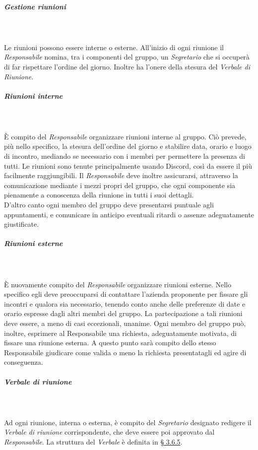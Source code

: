 \subparagraph{Gestione riunioni}\mbox{} \\ \mbox{} \\
Le riunioni possono essere interne o esterne. All'inizio di ogni riunione il \textit{Responsabile} nomina, tra i componenti del gruppo, un \textit{Segretario} che si occuperà di far rispettare l'ordine del giorno. Inoltre ha l'onere della stesura del \textit{Verbale di Riunione}\glo.

\subparagraph*{Riunioni interne} \mbox{} \\ \mbox{} \\
È compito del \textit{Responsabile} organizzare riunioni interne al gruppo. Ciò prevede, più nello specifico, la stesura dell'ordine del giorno e
stabilire data, orario e luogo di incontro, mediando se necessario con i membri per permettere la presenza di tutti. Le riunioni sono tenute principalmente usando Discord, così da essere il più facilmente raggiungibili.
Il \textit{Responsabile} deve inoltre assicurarsi, attraverso la comunicazione
mediante i mezzi propri del gruppo, che ogni componente sia pienamente a conoscenza della riunione in tutti i suoi dettagli. \\
D'altro canto ogni membro del gruppo deve presentarsi puntuale agli appuntamenti,
e comunicare in anticipo eventuali ritardi o assenze adeguatamente giustificate.

\subparagraph*{Riunioni esterne} \mbox{} \\ \mbox{} \\
È nuovamente compito del \textit{Responsabile} organizzare riunioni esterne.
Nello specifico egli deve preoccuparsi di contattare l'azienda proponente per fissare gli
incontri e qualora sia necessario, tenendo conto anche delle preferenze di date e orario
espresse dagli altri membri del gruppo. La partecipazione a tali riunioni deve essere,
a meno di casi eccezionali, unanime.
Ogni membro del gruppo può, inoltre, esprimere al Responsabile una richiesta, adeguatamente motivata, di fissare una riunione esterna. A questo punto sarà compito
dello stesso Responsabile giudicare come valida o meno la richiesta presentatagli ed
agire di conseguenza.

\subparagraph*{Verbale di riunione} \mbox{} \\ \mbox{} \\
Ad ogni riunione, interna o esterna, è compito del \textit{Segretario} designato redigere il \textit{Verbale di riunione} corrispondente, che deve essere poi approvato dal \textit{Responsabile}. La struttura del \textit{Verbale} è definita in \hyperref[par:verbali]{§ 3.6.5}.
